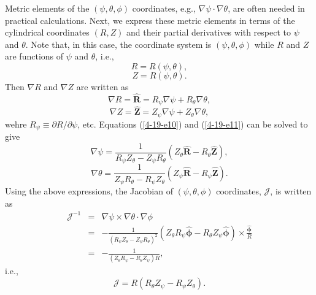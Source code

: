 \documentclass{article}
\newcommand{\tmmathbf}[1]{\ensuremath{\boldsymbol{#1}}}
\begin{document}
Metric elements of the $(\psi, \theta, \phi)$ coordinates, e.g., $\nabla \psi
\cdot \nabla \theta$, are often needed in practical calculations. Next, we
express these metric elements in terms of the cylindrical coordinates $(R, Z)$
and their partial derivatives with respect to $\psi$ and $\theta$. Note that,
in this case, the coordinate system is $(\psi, \theta, \phi)$ while $R$ and
$Z$ are functions of $\psi$ and $\theta$, i.e.,
\begin{equation}
  R = R (\psi, \theta),
\end{equation}
\begin{equation}
  Z = R (\psi, \theta) .
\end{equation}
Then $\nabla R$ and $\nabla Z$ are written as
\begin{equation}
  \label{4-19-e10} \nabla R = \hat{\mathbf{R}} = R_{\psi} \nabla \psi +
  R_{\theta} \nabla \theta,
\end{equation}
\begin{equation}
  \label{4-19-e11} \nabla Z = \hat{\mathbf{Z}} = Z_{\psi} \nabla \psi +
  Z_{\theta} \nabla \theta,
\end{equation}
wehre $R_{\psi} \equiv \partial R / \partial \psi$, etc. Equations
(\ref{4-19-e10}) and (\ref{4-19-e11}) can be solved to give
\begin{equation}
  \label{4-19-e2} \nabla \psi = \frac{1}{R_{\psi} Z_{\theta} - Z_{\psi}
  R_{\theta}} (Z_{\theta} \hat{\mathbf{R}} - R_{\theta} \hat{\mathbf{Z}}),
\end{equation}
\begin{equation}
  \label{4-19-e3} \nabla \theta = \frac{1}{Z_{\psi} R_{\theta} - R_{\psi}
  Z_{\theta}} (Z_{\psi} \hat{\mathbf{R}} - R_{\psi} \hat{\mathbf{Z}}) .
\end{equation}
Using the above expressions, the Jacobian of $(\psi, \theta, \phi)$
coordinates, $\mathcal{J}$, is written as
\begin{eqnarray}
  \mathcal{J}^{- 1} & = & \nabla \psi \times \nabla \theta \cdot \nabla \phi
  \nonumber\\
  & = & - \frac{1}{(R_{\psi} Z_{\theta} - Z_{\psi} R_{\theta})^2} (Z_{\theta}
  R_{\psi} \hat{\tmmathbf{\phi}} - R_{\theta} Z_{\psi} \hat{\tmmathbf{\phi}})
  \times \frac{\hat{\tmmathbf{\phi}}}{R} \nonumber\\
  & = & - \frac{1}{(Z_{\theta} R_{\psi} - R_{\theta} Z_{\psi}) R}, 
\end{eqnarray}
i.e.,
\begin{equation}
  \label{4-19-e1} \mathcal{J}= R (R_{\theta} Z_{\psi} - R_{\psi} Z_{\theta}) .
\end{equation}
\end{document}
